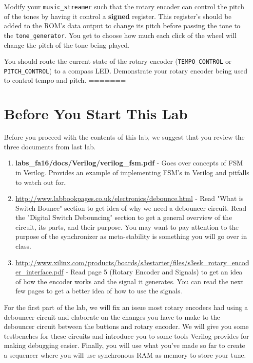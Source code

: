 \documentclass[11pt]{article}
\begin{document}
Modify your \verb|music_streamer| such that the rotary encoder can control the pitch of the tones by having it control a \textbf{signed} register. This register's should be added to the ROM's data output to change its pitch before passing the tone to the \verb|tone_generator|. You get to choose how much each click of the wheel will change the pitch of the tone being played.

You should route the current state of the rotary encoder (\verb|TEMPO_CONTROL| or \verb|PITCH_CONTROL|) to a compass LED. Demonstrate your rotary encoder being used to control tempo and pitch.
=======
\section{Before You Start This Lab}

Before you proceed with the contents of this lab, we suggest that you review the three documents from last lab.

\begin{enumerate}
	\item \textbf{labs\_fa16/docs/Verilog/verilog\_fsm.pdf} - Goes over concepts of FSM in Verilog. Provides an example of  implementing FSM's in Verilog and pitfalls to watch out for.
	
	\item \url{http://www.labbookpages.co.uk/electronics/debounce.html} - Read "What is Switch Bounce" section to get idea of why we need a debouncer circuit. Read the "Digital Switch Debouncing" section to get a general overview of the circuit, its parts, and their purpose. You may want to pay attention to the purpose of the synchronizer as meta-stability is something you will go over in class. 
	
	\item \url{http://www.xilinx.com/products/boards/s3estarter/files/s3esk_rotary_encoder_interface.pdf} - Read page 5 (Rotary Encoder and Signals) to get an idea of how the encoder works and the signal it generates. You can read the next few pages to get a better idea of how to use the signals. 

\end{enumerate}

For the first part of the lab, we will fix an issue most rotary encoders had using a debouncer circuit and elaborate on the changes you have to make to the debouncer circuit between the buttons and rotary encoder. We will give you some testbenches for these circuits and introduce you to some tools Verilog provides for making debugging easier. Finally, you will use what you've made so far to create a sequencer where you will use synchronous RAM as memory to store your tune.
\end{document}
